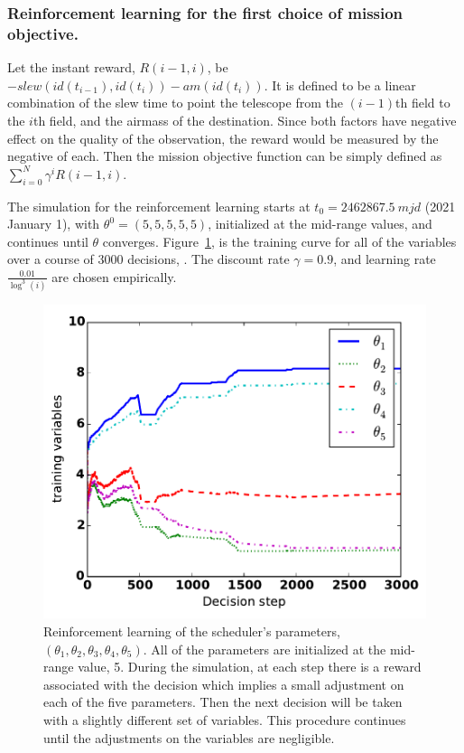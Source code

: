 \documentclass[12pt]{aastex62}
\theoremstyle{definition}
\begin{document}
\subsubsection{Reinforcement learning for the first choice of mission objective.} 

Let the instant reward, $R(i-1,i)$, be $-slew(id(t_{i-1}), id(t_{i})) - am(id(t_i))$. It is defined to be a linear combination of the slew time to point the telescope from the $(i-1)$th field to the $i$th field, and the airmass of the destination. Since both factors have negative effect on the quality of the observation, the reward would be measured by the negative of each. Then the mission objective function can be simply defined as  $\sum_{i=0}^N \gamma^i R(i-1, i)$.

The simulation for the reinforcement learning starts at $t_0 = 2462867.5~mjd$ (2021 January 1), with $\theta^0 = (5,5,5,5,5)$, initialized at the mid-range values, and continues until $\theta$ converges. Figure~\ref{fig_theta_conv}, is the training curve for all of the variables over a course of 3000 decisions, . The discount rate $\gamma = 0.9$, and learning rate $\frac{0.01}{\log^3(i)}$ are chosen empirically. 

\begin{figure}[h!]
\begin{center}
\includegraphics[width=0.5\linewidth]{TDcurve.pdf}
\end{center}
\caption{Reinforcement learning of the scheduler's parameters, $(\theta_1,\theta_2,\theta_3,\theta_4,\theta_5)$. All of the parameters are initialized at the mid-range value, 5. During the simulation, at each step there is a reward associated with the decision which implies a small adjustment on each of the five parameters. Then the next decision will be taken with a slightly different set of variables. This procedure continues until the adjustments on the variables are negligible.}
\label{fig_theta_conv}
\end{figure}
\end{document}
